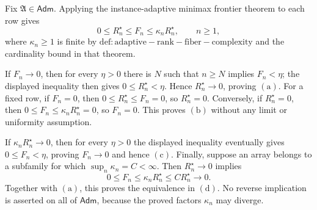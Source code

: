 Fix \(\mathfrak A\in\mathsf{Adm}\). Applying the instance-adaptive minimax frontier theorem to each row gives
\[
 0\le R_n^{\star}\le F_n\le\kappa_nR_n^{\star},
 \qquad n\ge1,
\]
where \(\kappa_n\ge1\) is finite by \(\mathrm{def:adaptive-rank-fiber-complexity}\) and the cardinality bound in that theorem.

If \(F_n\to0\), then for every \(\eta>0\) there is \(N\) such that \(n\ge N\) implies \(F_n<\eta\); the displayed inequality then gives \(0\le R_n^{\star}<\eta\). Hence \(R_n^{\star}\to0\), proving \(\mathrm{(a)}\). For a fixed row, if \(F_n=0\), then \(0\le R_n^{\star}\le F_n=0\), so \(R_n^{\star}=0\). Conversely, if \(R_n^{\star}=0\), then \(0\le F_n\le\kappa_nR_n^{\star}=0\), so \(F_n=0\). This proves \(\mathrm{(b)}\) without any limit or uniformity assumption.

If \(\kappa_nR_n^{\star}\to0\), then for every \(\eta>0\) the displayed inequality eventually gives \(0\le F_n<\eta\), proving \(F_n\to0\) and hence \(\mathrm{(c)}\). Finally, suppose an array belongs to a subfamily for which \(\sup_n\kappa_n=C<\infty\). Then \(R_n^{\star}\to0\) implies
\[
 0\le F_n\le\kappa_nR_n^{\star}\le C R_n^{\star}\longrightarrow0.
\]
Together with \(\mathrm{(a)}\), this proves the equivalence in \(\mathrm{(d)}\). No reverse implication is asserted on all of \(\mathsf{Adm}\), because the proved factors \(\kappa_n\) may diverge.